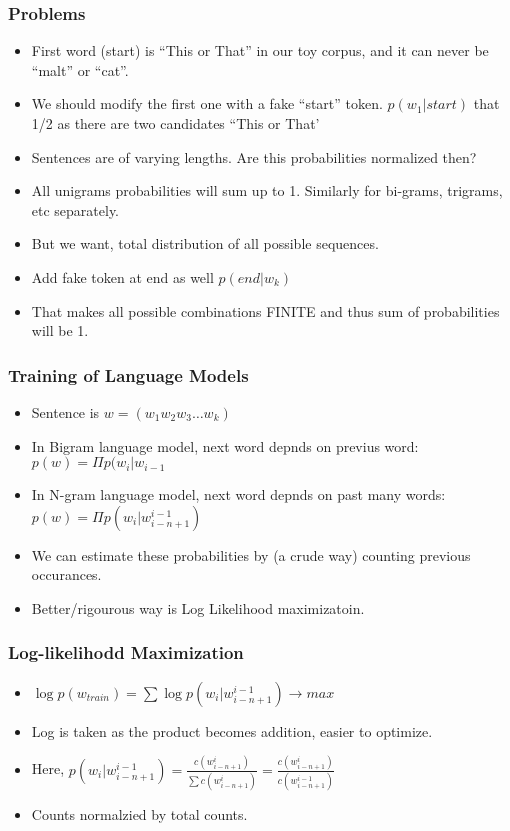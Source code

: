\begin{frame}[fragile]
  \frametitle{Problems}
  \begin{itemize}
  \item First word (start) is ``This or That'' in our toy corpus, and it can never be ``malt'' or ``cat''.
  \item We should modify the first one with a fake ``start'' token. $p(w_1|start)$ that 1/2 as there are two candidates ``This or That'
  \item Sentences are of varying lengths. Are this probabilities normalized then?
  \item All unigrams probabilities will sum up to 1. Similarly for bi-grams, trigrams, etc separately.
  \item But we want, total distribution of all possible sequences.
  \item Add fake token at end as well $p(end|w_k)$
  \item That makes all possible combinations FINITE and thus sum of probabilities will be 1.
  	  \end{itemize}
  	  
 \end{frame} 

\begin{frame}[fragile]
  \frametitle{Training of Language Models}
  \begin{itemize}
  \item  Sentence is $w = (w_1w_2w_3 \ldots w_k)$
  \item In Bigram language model, next word depnds on previus word: $p(w) = \Pi  p(w_i | w_{i-1}$
    \item In N-gram language model, next word depnds on past many words: $p(w) = \Pi  p(w_i | w^{i-1}_{i - n + 1})$
    \item We can estimate these probabilities by (a crude way) counting previous occurances.
    \item Better/rigourous way is Log Likelihood maximizatoin.
  	  \end{itemize}
  	  
 \end{frame} 
 
\begin{frame}[fragile]
  \frametitle{Log-likelihodd Maximization}
  \begin{itemize}
  \item  $\log p (w_{train}) = \sum \log p (w_i | w^{i-1}_{i-n+1}) \rightarrow max $
  \item Log is taken as the product becomes addition, easier to optimize.
  \item Here, $ p (w_i | w^{i-1}_{i-n+1}) = \frac{c(w^i_{i-n+1})}{\sum c(w^i_{i-n+1})} = \frac{c(w^i_{i-n+1})}{c(w^{i-1}_{i-n+1})} $
  \item Counts normalzied by total counts.
  	  \end{itemize}
  	  
 \end{frame} 
 
